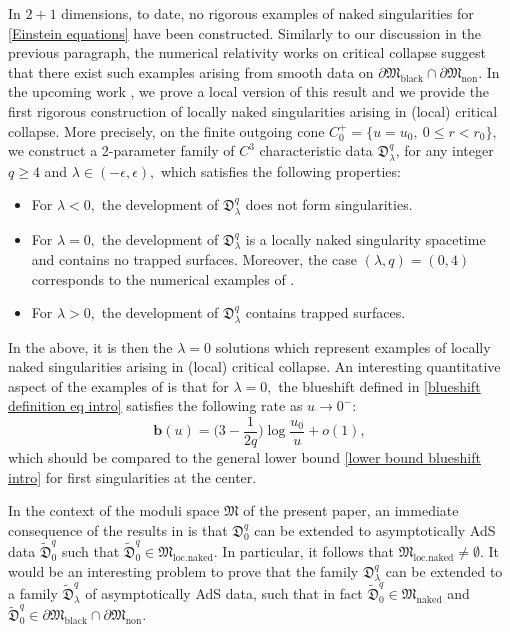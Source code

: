 \documentclass[11pt]{article}
\numberwithin{equation}{section}
\begin{document}
In $2+1$ dimensions, to date, no rigorous examples of naked singularities for \eqref{Einstein equations} have been constructed. Similarly to our discussion in the previous paragraph, the numerical relativity works on critical collapse \cite{Pretorius,jalmuzna} suggest that there exist such examples arising from smooth data on $\partial\mathfrak{M}_{\mathrm{black}}\cap\partial\mathfrak{M}_{\mathrm{non}}.$ In the upcoming work \cite{preparation}, we prove a local version of this result and we provide the first rigorous construction of locally naked singularities arising in (local) critical collapse. More precisely, on the finite outgoing cone $C_0^+=\{u=u_0,\ 0\leq r<r_0\},$ we construct a 2-parameter family of $C^3$ characteristic data $\mathfrak{D}_{\lambda}^q$, for any integer $q\geq4$ and $\lambda\in(-\epsilon,\epsilon),$ which satisfies the following properties:
\begin{itemize}
    \item For $\lambda<0,$ the development of $\mathfrak{D}_{\lambda}^q$ does not form singularities.
    \item For $\lambda=0,$ the development of $\mathfrak{D}_{\lambda}^q$ is a locally naked singularity spacetime and contains no trapped surfaces. %
    Moreover, the case $(\lambda,q)=(0,4)$ corresponds to the numerical examples of \cite{Pretorius,jalmuzna}.
    \item For $\lambda>0,$ the development of $\mathfrak{D}_{\lambda}^q$ contains trapped surfaces.
\end{itemize}
In the above, it is then the $\lambda=0$ solutions which represent examples of locally naked singularities arising in (local) critical collapse. An interesting quantitative aspect of the examples of \cite{preparation} is that for $\lambda=0,$ the blueshift defined in \eqref{blueshift definition eq intro} satisfies the following rate as $u\rightarrow0^-:$
\begin{equation}\label{blueshift rate for CR}
    \mathbf{b}(u)=\bigg(3-\frac{1}{2q}\bigg)\log\frac{u_0}{u}+o(1),
\end{equation}
which should be compared to the general lower bound \eqref{lower bound blueshift intro} for first singularities at the center. 

In the context of the moduli space $\mathfrak{M}$ of the present paper, an immediate consequence of the results in \cite{preparation} is that $\mathfrak{D}_{0}^q$ can be extended to asymptotically AdS data $\widetilde{\mathfrak{D}}_{0}^q$ such that $\widetilde{\mathfrak{D}}_{0}^q\in\mathfrak{M}_{\mathrm{loc.naked}}.$ In particular, it follows that $\mathfrak{M}_{\mathrm{loc.naked}}\neq\emptyset.$ It would be an interesting problem to prove that the family $\mathfrak{D}_{\lambda}^q$ can be extended to a family $\widetilde{\mathfrak{D}}_{\lambda}^q$ of asymptotically AdS data, such that in fact $\widetilde{\mathfrak{D}}_{0}^q\in\mathfrak{M}_{\mathrm{naked}}$ and $\widetilde{\mathfrak{D}}_{0}^q\in\partial\mathfrak{M}_{\mathrm{black}}\cap\partial\mathfrak{M}_{\mathrm{non}}.$
\end{document}
